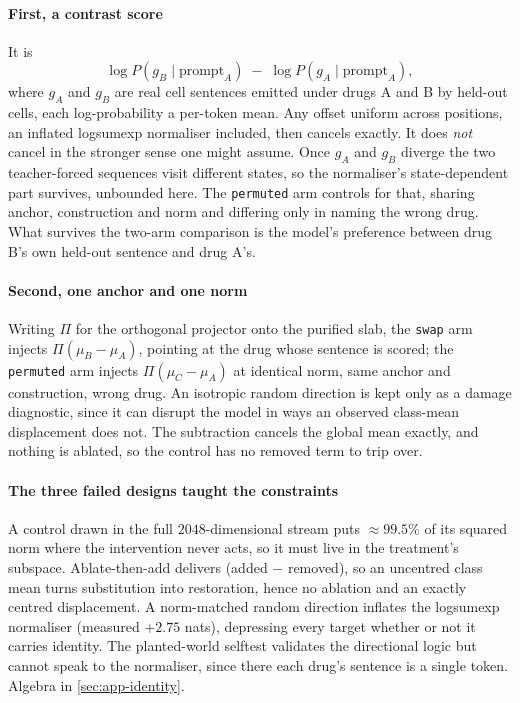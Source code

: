 \paragraph{First, a contrast score} It is
\begin{equation}
 \log P\!\left(g_B \mid \textrm{prompt}_A\right) \;-\;
 \log P\!\left(g_A \mid \textrm{prompt}_A\right),
\end{equation}
where $g_A$ and $g_B$ are real cell sentences emitted under drugs A and B by
held-out cells, each log-probability a per-token mean. Any offset uniform across
positions, an inflated logsumexp normaliser included, then cancels exactly. It
does \emph{not} cancel in the stronger sense one might assume. Once $g_A$ and
$g_B$ diverge the two teacher-forced sequences visit different states, so the
normaliser's state-dependent part survives, unbounded here. The \texttt{permuted}
arm controls for that, sharing anchor, construction and norm and differing only
in naming the wrong drug. What survives the two-arm comparison is the model's
preference between drug B's own held-out sentence and drug A's.

\paragraph{Second, one anchor and one norm} Writing $\Pi$ for the orthogonal
projector onto the purified slab, the \texttt{swap} arm injects
$\Pi(\mu_B - \mu_A)$, pointing at the drug whose sentence is scored; the
\texttt{permuted} arm injects $\Pi(\mu_C - \mu_A)$ at identical norm, same anchor
and construction, wrong drug. An isotropic random direction is kept only as a
damage diagnostic, since it can disrupt the model in ways an observed class-mean
displacement does not. The subtraction cancels the global mean exactly, and
nothing is ablated, so the control has no removed term to trip over.

\paragraph{The three failed designs taught the constraints} A control drawn in
the full $2048$-dimensional stream puts $\approx 99.5\%$ of its squared norm
where the intervention never acts, so it must live in the treatment's subspace.
Ablate-then-add delivers (added $-$ removed), so an uncentred class mean turns
substitution into restoration, hence no ablation and an exactly centred
displacement. A norm-matched random direction inflates the logsumexp normaliser
(measured $+2.75$ nats), depressing every target whether or not it carries
identity. The planted-world selftest validates the directional logic but cannot
speak to the normaliser, since there each drug's sentence is a single token.
Algebra in \cref{sec:app-identity}.

